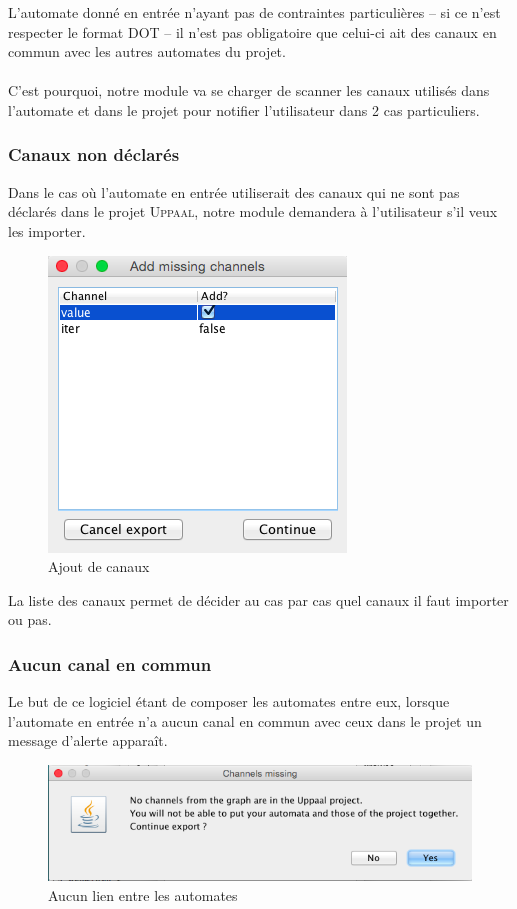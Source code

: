 \documentclass[12pt,a4paper]{report}
\begin{document}
L'automate donné en entrée n'ayant pas de contraintes particulières -- si ce n'est respecter 
le format DOT -- il n'est pas obligatoire que celui-ci ait des canaux en commun avec 
les autres automates du projet.
\\\\
C'est pourquoi, notre module va se charger de scanner les canaux utilisés dans l'automate 
et dans le projet pour notifier l'utilisateur dans 2 cas particuliers.

\subsubsection*{Canaux non déclarés}

Dans le cas où l'automate en entrée utiliserait des canaux qui ne sont pas déclarés
dans le projet \textsc{Uppaal}, notre module demandera à l'utilisateur s'il veux les 
importer.

\begin{figure}[h]
  \centering
  \includegraphics[scale=0.6]{ressources/gui/channels.png}
  \caption{Ajout de canaux}
\end{figure}

La liste des canaux permet de décider au cas par cas quel canaux il faut importer ou pas.

\subsubsection*{Aucun canal en commun}
Le but de ce logiciel étant de composer les automates entre eux, lorsque l'automate en 
entrée n'a aucun canal en commun avec ceux dans le projet un message d'alerte apparaît.

\begin{figure}[h]
  \centering
  \includegraphics[scale=0.6]{ressources/gui/missing.png}
  \caption{Aucun lien entre les automates}
\end{figure}
\end{document}
